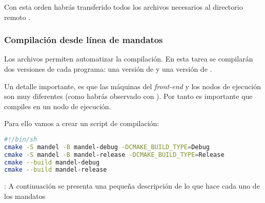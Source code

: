 Con esta orden habrás transferido todos los archivos necesarios al directorio
remoto .

\subsubsection{Compilación desde línea de mandatos}

Los archivos  permiten automatizar la compilación. En esta tarea
se compilarán dos versiones de cada programa: una versión de 
y una versión de .

Un detalle importante, es que las máquinas del \emph{front-end} y los nodos de
ejecución son muy diferentes (como habrás observado con ). Por
tanto es importante que compiles en un nodo de ejecución.

Para ello vamos a crear un script de compilación:
\begin{lstlisting}[language=bash,frame=single,title={Archivo: build.sh}]
#!/bin/sh
cmake -S mandel -B mandel-debug -DCMAKE_BUILD_TYPE=Debug
cmake -S mandel -B mandel-release -DCMAKE_BUILD_TYPE=Release
cmake --build mandel-debug
cmake --build mandel-release 
\end{lstlisting}

: A continuación se presenta una pequeña descripción
de lo que hace cada uno de los mandatos

